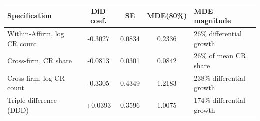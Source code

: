 \begin{tabular}{lcccl}
\toprule
Specification & DiD coef. & SE & MDE(80\%) & MDE magnitude \\
\midrule
Within-Affirm, log CR count & -0.3027 & 0.0834 & 0.2336 & 26\% differential growth \\
Cross-firm, CR share & -0.0813 & 0.0301 & 0.0842 & 26\% of mean CR share \\
Cross-firm, log CR count & -0.3305 & 0.4349 & 1.2183 & 238\% differential growth \\
Triple-difference (DDD) & +0.0393 & 0.3596 & 1.0075 & 174\% differential growth \\
\bottomrule
\end{tabular}